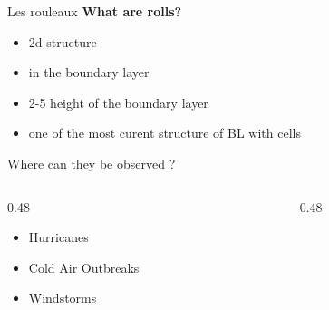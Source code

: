 
\usepackage[style=authoryear, backend=biber]{biblatex}






\begin{frame}{Les rouleaux}
\textbf{What are rolls?	}
	\begin{itemize}[itemsep=1pt]
		\item 2d structure
		\item in the boundary layer
		\item 2-5 height of the boundary layer
		\item one of the most curent structure of BL with cells 
	\end{itemize}




  Where can they be observed ?
  \begin{columns}
    \begin{column}{0.48\textwidth}

      \begin{itemize}
        \item Hurricanes 
        \item Cold Air Outbreaks
        \item Windstorms \cite{lfarhImpactSurfaceTurbulent2024}
      \end{itemize}
    \end{column}
    \begin{column}{0.48\textwidth}
    \end{column}
  \end{columns}

\end{frame}

\begin{frame}
\printbibliography
\end{frame}


